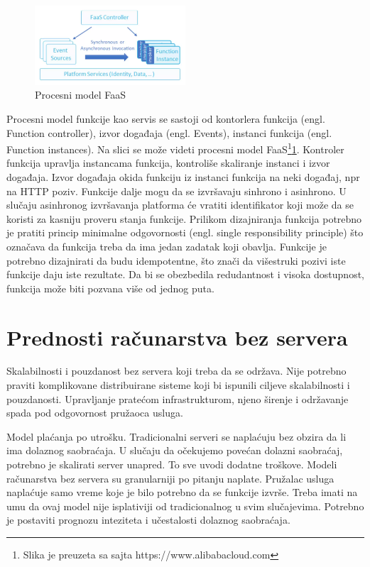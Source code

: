 \documentclass[12pt,oneside]{memoir}
\begin{document}
\begin{figure}[!ht]
  \centering
  \includegraphics[width=0.5\textwidth]{Slika 7.png}
  \caption{Procesni model FaaS}
  \label{fig:faasProcesniModel}
\end{figure}


Procesni model funkcije kao servis se sastoji od kontorlera funkcija (engl. Function controller), izvor događaja (engl. Events), instanci funkcija (engl. Function instances). Na slici se može videti procesni model FaaS\footnote{Slika je preuzeta sa sajta https://www.alibabacloud.com}\ref{fig:faasProcesniModel}. Kontroler funkcija upravlja instancama funkcija, kontroliše skaliranje instanci i izvor događaja. Izvor događaja okida funkciju iz instanci funkcija na neki događaj, npr na HTTP poziv. Funkcije dalje mogu da se izvršavaju sinhrono i asinhrono. U slučaju asinhronog izvršavanja platforma će vratiti identifikator koji može da se koristi za kasniju proveru stanja funkcije\cite{sah}. Prilikom dizajniranja funkcija potrebno je pratiti princip minimalne odgovornosti (engl. single responsibility principle) što označava da funkcija treba da ima jedan zadatak koji obavlja. Funkcije je potrebno dizajnirati da budu idempotentne, što znači da višestruki pozivi iste funkcije daju iste rezultate. Da bi se obezbedila redudantnost i visoka dostupnost, funkcija može biti pozvana više od jednog puta\cite{sah}. 

\section{Prednosti računarstva bez servera}

Skalabilnosti i pouzdanost bez servera koji treba da se održava. Nije potrebno praviti komplikovane distribuirane sisteme koji bi ispunili ciljeve skalabilnosti i pouzdanosti. Upravljanje pratećom infrastrukturom, njeno širenje i održavanje spada pod odgovornost pružaoca usluga.

Model plaćanja po utrošku. Tradicionalni serveri se naplaćuju bez obzira da li ima dolaznog saobraćaja. U slučaju da očekujemo povećan dolazni saobraćaj, potrebno je skalirati server unapred. To sve uvodi dodatne troškove. Modeli računarstva bez servera su granularniji po pitanju naplate. Pružalac usluga naplaćuje samo vreme koje je bilo potrebno da se funkcije izvrše. Treba imati na umu da ovaj model nije isplativiji od tradicionalnog u svim slučajevima\cite{sa}. Potrebno je postaviti prognozu inteziteta i učestalosti dolaznog saobraćaja.
\end{document}
